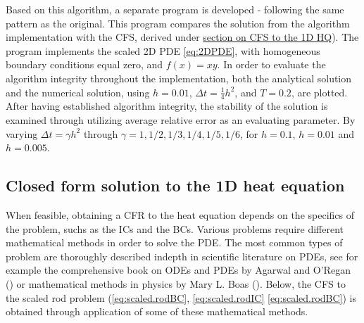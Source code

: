 \documentclass[%
oneside,                 %
final,                   %
10pt]{article}
\begin{document}
\begin{center}\end{center}
Based on this algorithm, a separate program is developed - following the same pattern as the original. This program compares the solution from the algorithm implementation with the CFS, derived under \hyperref[M.CFS2D]{section on CFS to the 1D HQ}). The program implements the scaled 2D PDE \eqref{eq:2DPDE}, with homogeneous boundary conditions equal zero, and $f(x)=xy$. In order to evaluate the algorithm integrity throughout the implementation, both the analytical solution and the numerical solution, using $h=0.01$, $\Delta t=\frac{1}{4} h^2$, and $T=0.2$, are plotted.\newline
After having established algorithm integrity, the stability of the solution is examined through utilizing average relative error as an evaluating parameter. By varying $\Delta t=\gamma h^2$ through $\gamma=1, 1/2, 1/3, 1/4,1/5,1/6$, for $h=0.1$, $h=0.01$ and $h=0.005$.

\subsection{Closed form solution to the 1D heat equation}
\label{M.CFS1d}
When feasible, obtaining a CFR to the heat equation depends on the specifics of the problem, suchs as the ICs and the BCs. Various problems require different mathematical methods in order to solve the PDE. The most common types of problem are thoroughly described indepth in scientific literature on PDEs, see for example the comprehensive book on ODEs and PDEs by Agarwal and O’Regan (\cite{ravi}) or mathematical methods in physics by Mary L. Boas (\cite{matmet}). Below, the CFS to the scaled rod problem (\eqref{eq:scaled.rodBC}, \eqref{eq:scaled.rodIC} \eqref{eq:scaled.rodBC}) is obtained through  application of some of these mathematical methods. \newline
\end{document}
